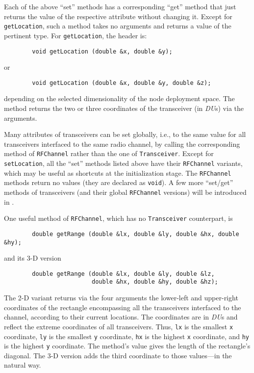 Each of the above ``set'' methods has a corresponding ``get'' method that
just returns the value of the respective attribute without changing it.
Except for {\tt getLocation}, such a method takes no arguments and
returns a value of the pertinent type.
For {\tt getLocation}, the header is:
\begin{verbatim}
        void getLocation (double &x, double &y);
\end{verbatim}
\noindent
or
\begin{verbatim}
        void getLocation (double &x, double &y, double &z);
\end{verbatim}
\noindent
depending on the selected dimensionality of the node deployment space.
The method returns the two or three coordinates of the transceiver
(in {\em DU\/}s) via the arguments.

Many attributes of transceivers can be set globally, i.e., to the same value
for all transceivers interfaced to the same radio channel, by calling the
corresponding method of {\tt RFChannel} rather than the one of
{\tt Transceiver}.
Except for {\tt setLocation}, all the ``set'' methods listed above
have their {\tt RFChannel} variants, which may be useful as shortcuts at the
initialization stage.
The {\tt RFChannel} methods return no values (they are declared as {\tt void}).
A few more ``set/get'' methods of transceivers (and their global 
{\tt RFChannel} versions) will be introduced in .

One useful method of {\tt RFChannel}, which has no
{\tt Transceiver} counterpart, is
\begin{verbatim}
        double getRange (double &lx, double &ly, double &hx, double &hy);
\end{verbatim}
\noindent
and its 3-D version
\begin{verbatim}
        double getRange (double &lx, double &ly, double &lz,
                         double &hx, double &hy, double &hz);
\end{verbatim}
\noindent
The 2-D variant
returns via the four arguments the lower-left and upper-right
coordinates of the rectangle encompassing all the transceivers interfaced
to the channel, according to their current locations.
The coordinates are in {\em DU\/}s and reflect the extreme coordinates of
all transceivers.
Thus, {\tt lx} is the smallest {\tt x} coordinate, {\tt ly} is the smallest
{\tt y} coordinate, {\tt hx} is the highest {\tt x} coordinate, and
{\tt hy} is the highest {\tt y} coordinate.
The method's value gives the length of the rectangle's diagonal.
The 3-D version adds the third coordinate to those values---in the
natural way.

